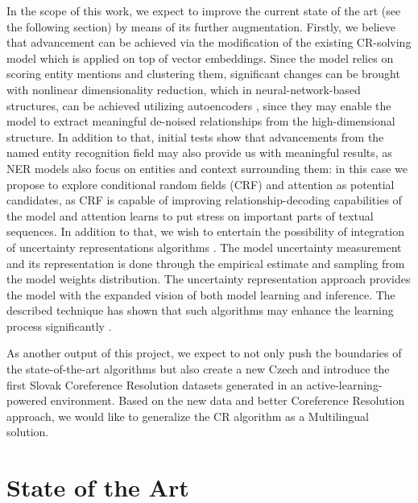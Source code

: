 In the scope of this work, we expect to improve the current state of the art (see the following section) by means of its further augmentation. 
Firstly, we believe that advancement can be achieved via the modification of the existing CR-solving model which is applied on top of vector embeddings. 
Since the model relies on scoring entity mentions and clustering them, significant changes can be brought with nonlinear dimensionality reduction, which in neural-network-based structures, can be achieved utilizing autoencoders \cite{autoencoders-Zabalza2016,autoencoders-Sahay2019}, since they may enable the model to extract meaningful de-noised relationships from the high-dimensional structure. 
In addition to that, initial tests show that advancements from the named entity recognition field may also provide us with meaningful results, as NER models also focus on entities and context surrounding them: in this case we propose to explore conditional random fields (CRF) \cite{ner-Strakova2019,ner-Zhanming2019,ner-Zhanming2019} and attention \cite{ner-Yamada2020} as potential candidates, as CRF is capable of improving relationship-decoding capabilities of the model and attention learns to put stress on important parts of textual sequences. 
In addition to that, we wish to entertain the possibility of integration of uncertainty representations algorithms \cite{lakshminarayanan2016simple, gal2017deep,welling2011bayesian}. 
The model uncertainty measurement and its representation is done through the empirical estimate and sampling from the model weights distribution. 
The uncertainty representation approach provides the model with the expanded vision of both model learning and inference. 
The described technique has shown that such algorithms may enhance the learning process significantly \cite{ovadia2019can}.


{\color{red}
As another output of this project, we expect to not only push the boundaries of the state-of-the-art algorithms but also create a new Czech and introduce the first Slovak Coreference Resolution datasets generated in an active-learning-powered environment.
Based on the new data and better Coreference Resolution approach, we would like to generalize the CR algorithm as a Multilingual solution.
}

\section{State of the Art}\label{sec:sota}

